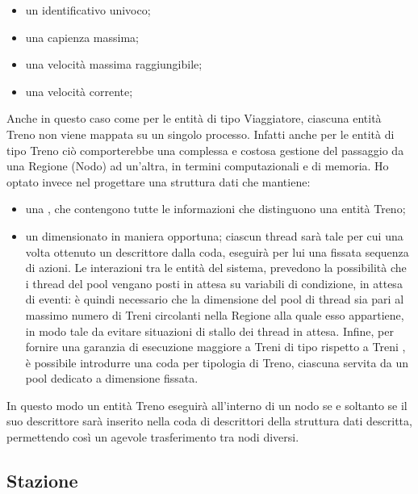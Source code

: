 		\begin{itemize}
			\item un identificativo univoco;
			\item una capienza massima;
			\item una velocità massima raggiungibile;
			\item una velocità corrente;
		\end{itemize}
	
	Anche in questo caso come per le entità di tipo Viaggiatore, ciascuna entità Treno non viene mappata su un singolo processo. Infatti anche per le entità di tipo Treno ciò comporterebbe una complessa e costosa gestione del passaggio da una Regione (Nodo) ad un'altra, in termini computazionali e di memoria. 
	Ho optato invece nel progettare una struttura dati  che mantiene:
		\begin{itemize}
			\item una , che contengono tutte le informazioni che distinguono una entità Treno;
			\item un  dimensionato in maniera opportuna; ciascun thread sarà tale per cui una volta ottenuto un descrittore dalla coda, eseguirà per lui una fissata sequenza di azioni. Le interazioni tra le entità del sistema, prevedono la possibilità che i thread del pool vengano posti in attesa su variabili di condizione, in attesa di eventi: è quindi necessario che la dimensione del pool di thread sia pari al massimo numero di Treni circolanti nella Regione alla quale esso appartiene, in modo tale da evitare situazioni di stallo dei thread in attesa. Infine, per fornire una garanzia di esecuzione maggiore a Treni di tipo  rispetto a Treni , è possibile introdurre una coda per tipologia di Treno, ciascuna servita da un pool dedicato a dimensione fissata.
		\end{itemize}
	In questo modo un entità Treno eseguirà all'interno di un nodo se e soltanto se il suo descrittore sarà inserito nella coda di descrittori della struttura dati descritta, permettendo così un agevole trasferimento tra nodi diversi.
				
	\subsection{Stazione} \label{subsec:station}
	
